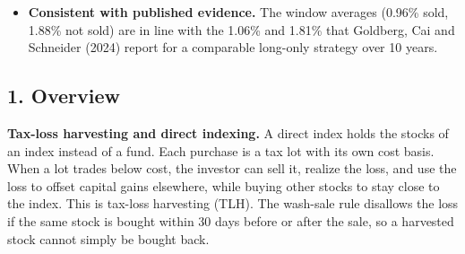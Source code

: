 \documentclass[
  11pt,
]{article}
\providecommand{\tightlist}{%
  \setlength{\itemsep}{0pt}\setlength{\parskip}{0pt}}
\begin{document}
\begin{itemize}
  \begin{itemize}
  \tightlist
  \item
    \emph{Main:} S1 earns a tax alpha over S0 of \textbf{1.14\% per year} if the account is sold at the end and \textbf{1.25\%} if it is not, with a realized tracking error of 0.4\% and trading costs of 1.3 bp per year.
  \item
    \emph{Out of sample (2013--2025):} 0.28\% / 0.43\%. In the calm 2013--2025 bull market S1 deviated less from the index (TE 0.25\%) and had few losses to harvest.
  \item
    \emph{Start date:} in 21 six-year windows, tax alpha ranges from 0.22\% (2013--2018) to 3.03\% (2008--2013). Most losses come in the first years and in sell-offs.
  \item
    \emph{Risk--tax trade-off:} in a separate experiment with a cap on tracking error, raising the cap from 0.25\% to 2\% raises tax alpha from 1.15\% to 1.87\%, with diminishing returns.
  \item
    \emph{Optimizer:} the monthly problem is non-convex, so the optimizer solves it approximately in two convex steps. The approximation costs little: in 99\% of months, the cost of the trades made is within 0.01\% of NAV of the optimal cost.
  \item
    \emph{S2:} no improvement over S1 at the same tracking error.
  \end{itemize}
\item
  \textbf{Consistent with published evidence.} The window averages (0.96\% sold, 1.88\% not sold) are in line with the 1.06\% and 1.81\% that Goldberg, Cai and Schneider (2024) report for a comparable long-only strategy over 10 years.
\end{itemize}

\hypertarget{overview}{%
\subsection{1. Overview}\label{overview}}

\textbf{Tax-loss harvesting and direct indexing.} A direct index holds the stocks of an index instead of a fund. Each purchase is a tax lot with its own cost basis. When a lot trades below cost, the investor can sell it, realize the loss, and use the
loss to offset capital gains elsewhere, while buying other stocks to stay close to the index. This is tax-loss harvesting (TLH). The wash-sale rule disallows the loss if the same stock is bought within 30 days before or after the sale, so a harvested
stock cannot simply be bought back.
\end{document}
